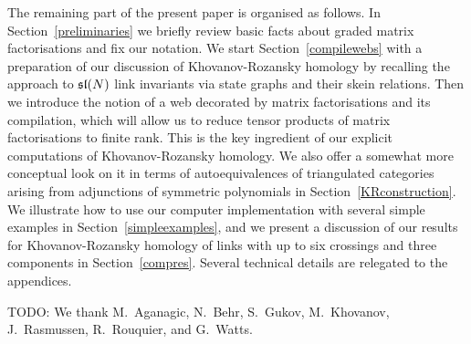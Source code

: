 \documentclass{compositio}
\theoremstyle{definition}
\numberwithin{equation}{section}
\begin{document}
\medskip

The remaining part of the present paper is organised as follows. In Section~\ref{preliminaries} we briefly review basic facts about graded matrix factorisations and fix our notation. We start Section~\ref{compilewebs} with a preparation of our discussion of Khovanov-Rozansky homology by recalling the approach to $\mathfrak{sl}(N)$ link invariants via state graphs and their skein relations. Then we introduce the notion of a web decorated by matrix factorisations and its compilation, which will allow us to reduce tensor products of matrix factorisations to finite rank. This is the key ingredient of our explicit computations of Khovanov-Rozansky homology. We also offer a somewhat more conceptual look on it in terms of autoequivalences of triangulated categories arising from adjunctions of symmetric polynomials in Section~\ref{KRconstruction}. We illustrate how to use our computer implementation with several simple examples in Section~\ref{simpleexamples}, and we present a discussion of our results for Khovanov-Rozansky homology of links with up to six crossings and three components in Section~\ref{compres}. Several technical details are relegated to the appendices. 


\begin{acknowledgements}
TODO: We thank M.~Aganagic, N.~Behr, S.~Gukov, M.~Khovanov, J.~Rasmussen, R.~Rouquier, and G.~Watts. 
\end{acknowledgements}

%
%
%
\end{document}
